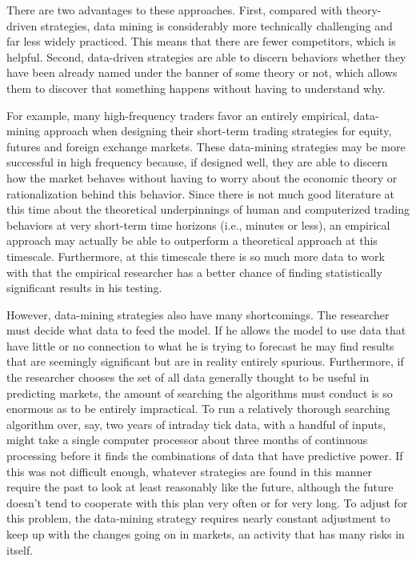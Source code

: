 \documentclass[11pt]{report}
\begin{document}
			There are two advantages to these approaches. First, compared with theory-driven strategies, data mining is considerably more technically challenging and far less widely practiced. This means that there are fewer competitors, which is helpful. Second, data-driven strategies are able to discern behaviors whether they have been already named under the banner of some theory or not, which allows them to discover that something happens without having to understand why.
 			
 			For example, many high-frequency traders favor an entirely empirical, data-mining approach when designing their short-term trading strategies for equity, futures and foreign exchange markets. These data-mining strategies may be more successful in high frequency because, if designed well, they are able to discern how the market behaves without having to worry about the economic theory or rationalization behind this behavior. Since there is not much good literature at this time about the theoretical underpinnings of human and computerized trading behaviors at very short-term time horizons (i.e., minutes or less), an empirical approach may actually be able to outperform a theoretical approach at this timescale. Furthermore, at this timescale there is so much more data to work with that the empirical researcher has a better chance of finding statistically significant results in his testing.

			However, data-mining strategies also have many shortcomings. The researcher must decide what data to feed the model. If he allows the model to use data that have little or no connection to what he is trying to forecast he may find results that are seemingly significant but are in reality entirely spurious. Furthermore, if the researcher chooses the set of all data generally thought to be useful in predicting markets, the amount of searching the algorithms must conduct is so enormous as to be entirely impractical. To run a relatively thorough searching algorithm over, say, two years of intraday tick data, with a handful of inputs, might take a single computer processor about three months of continuous processing before it finds the combinations of data that have predictive power. If this was not difficult enough, whatever strategies are found in this manner require the past to look at least reasonably like the future, although the future doesn't tend to cooperate with this plan very often or for very long. To adjust for this problem, the data-mining strategy requires nearly constant adjustment to keep up with the changes going on in markets, an activity that has many risks in itself.
			
\end{document}
